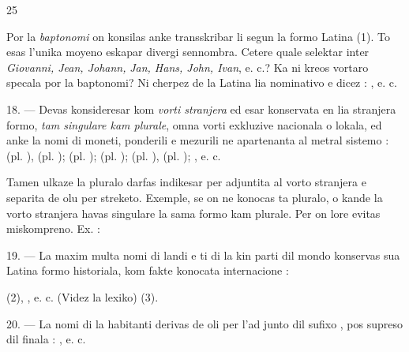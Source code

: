\begin{VUpage}[29]{25}

Por la \textit{baptonomi} on konsilas anke transskribar li segun\nl
la formo Latina (1). To esas l'unika moyeno eskapar divergi\nl
sennombra. Cetere quale selektar inter \textit{Giovanni, Jean, Johann,}\nl
\textit{Jan, Hans, John, Ivan}, e. c.? Ka ni kreos vortaro specala por\nl
la baptonomi? Ni cherpez de la Latina lia nominativo e dicez :\nl
{}\nl
{}\nl
{}, e. c.

\VUblanc{5.75pt}%
18. --- Devas konsideresar kom \textit{vorti stranjera} ed esar\nl
konservata en lia stranjera formo, \textit{tam singulare kam plurale},\nl
omna vorti exkluzive nacionala o lokala, ed anke la nomi\nl
di moneti, ponderili e mezurili ne apartenanta al metral\nl
sistemo : \nl
{} (pl. ),  (pl. \cc
{});  (pl. );  (pl. ); \nl
(pl. ),  (pl. ); \nl
{}, e. c.

Tamen ulkaze la pluralo darfas indikesar per  adjuntita\nl
al vorto stranjera e separita de olu per streketo. Exemple, se\nl
on ne konocas ta pluralo, o kande la vorto stranjera havas\nl
singulare la sama formo kam plurale. Per  on lore evitas\nl
miskompreno. Ex. : \nl
{}

\VUblanc{6.00pt}%
19. --- La maxim multa nomi di landi e ti di la kin\nl
parti dil mondo konservas sua Latina formo historiala, kom\nl
fakte konocata internacione :

 (2), \nl
{}\nl
{}\nl
{}, e. c. (Videz la lexiko) (3).

\VUblanc{5.98pt}%
20. --- La nomi di la habitanti derivas de oli per l'ad\cc
junto dil sufixo , pos supreso dil  finala : \nl
{}, e. c.
\end{VUpage}

